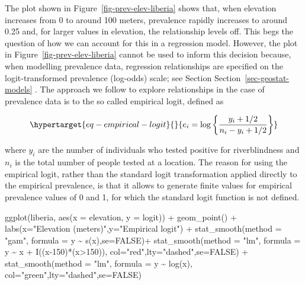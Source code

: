 \documentclass[
  letterpaper,
]{krantz}
\newenvironment{Shaded}{\begin{snugshade}}{\end{snugshade}}
\newcommand{\AttributeTok}[1]{\textcolor[rgb]{0.40,0.45,0.13}{#1}}
\newcommand{\ConstantTok}[1]{\textcolor[rgb]{0.56,0.35,0.01}{#1}}
\newcommand{\DecValTok}[1]{\textcolor[rgb]{0.68,0.00,0.00}{#1}}
\newcommand{\FunctionTok}[1]{\textcolor[rgb]{0.28,0.35,0.67}{#1}}
\newcommand{\NormalTok}[1]{\textcolor[rgb]{0.00,0.23,0.31}{#1}}
\newcommand{\SpecialCharTok}[1]{\textcolor[rgb]{0.37,0.37,0.37}{#1}}
\newcommand{\StringTok}[1]{\textcolor[rgb]{0.13,0.47,0.30}{#1}}
\begin{document}
The plot shown in Figure~\ref{fig-prev-elev-liberia} shows that, when
elevation increases from 0 to around 100 meters, prevalence rapidly
increases to around 0.25 and, for larger values in elevation, the
relationship levels off. This begs the question of how we can account
for this in a regression model. However, the plot in
Figure~\ref{fig-prev-elev-liberia} cannot be used to inform this
decision because, when modelling prevalence data, regression
relationships are specified on the logit-transformed prevalence
(log-odds) scale; see Section Section~\ref{sec-geostat-models} . The
approach we follow to explore relationships in the case of prevalence
data is to the so called empirical logit, defined as

\begin{equation}\protect\hypertarget{eq-empirical-logit}{}{
e_{i} = \log\left\{\frac{y_i + 1/2}{n_i - y_i + 1/2}\right\}
}\label{eq-empirical-logit}\end{equation}

where \(y_i\) are the number of individuals who tested positive for
riverblindness and \(n_i\) is the total number of people tested at a
location. The reason for using the empirical logit, rather than the
standard logit transformation applied directly to the empirical
prevalence, is that it allows to generate finite values for empirical
prevalence values of 0 and 1, for which the standard logit function is
not defined.

\begin{Shaded}
\begin{Highlighting}[]
\FunctionTok{ggplot}\NormalTok{(liberia, }\FunctionTok{aes}\NormalTok{(}\AttributeTok{x =}\NormalTok{ elevation, }\AttributeTok{y =}\NormalTok{ logit)) }\SpecialCharTok{+} \FunctionTok{geom\_point}\NormalTok{() }\SpecialCharTok{+}
  \FunctionTok{labs}\NormalTok{(}\AttributeTok{x=}\StringTok{"Elevation (meters)"}\NormalTok{,}\AttributeTok{y=}\StringTok{"Empirical logit"}\NormalTok{) }\SpecialCharTok{+}
  \FunctionTok{stat\_smooth}\NormalTok{(}\AttributeTok{method =} \StringTok{"gam"}\NormalTok{, }\AttributeTok{formula =}\NormalTok{ y }\SpecialCharTok{\textasciitilde{}} \FunctionTok{s}\NormalTok{(x),}\AttributeTok{se=}\ConstantTok{FALSE}\NormalTok{)}\SpecialCharTok{+}
  \FunctionTok{stat\_smooth}\NormalTok{(}\AttributeTok{method =} \StringTok{"lm"}\NormalTok{, }\AttributeTok{formula =}\NormalTok{ y }\SpecialCharTok{\textasciitilde{}}\NormalTok{ x }\SpecialCharTok{+} \FunctionTok{I}\NormalTok{((x}\DecValTok{{-}150}\NormalTok{)}\SpecialCharTok{*}\NormalTok{(x}\SpecialCharTok{\textgreater{}}\DecValTok{150}\NormalTok{)),}
              \AttributeTok{col=}\StringTok{"red"}\NormalTok{,}\AttributeTok{lty=}\StringTok{"dashed"}\NormalTok{,}\AttributeTok{se=}\ConstantTok{FALSE}\NormalTok{) }\SpecialCharTok{+}
  \FunctionTok{stat\_smooth}\NormalTok{(}\AttributeTok{method =} \StringTok{"lm"}\NormalTok{, }\AttributeTok{formula =}\NormalTok{ y }\SpecialCharTok{\textasciitilde{}} \FunctionTok{log}\NormalTok{(x),}
              \AttributeTok{col=}\StringTok{"green"}\NormalTok{,}\AttributeTok{lty=}\StringTok{"dashed"}\NormalTok{,}\AttributeTok{se=}\ConstantTok{FALSE}\NormalTok{)}
 
\end{Highlighting}
\end{Shaded}
\end{document}
